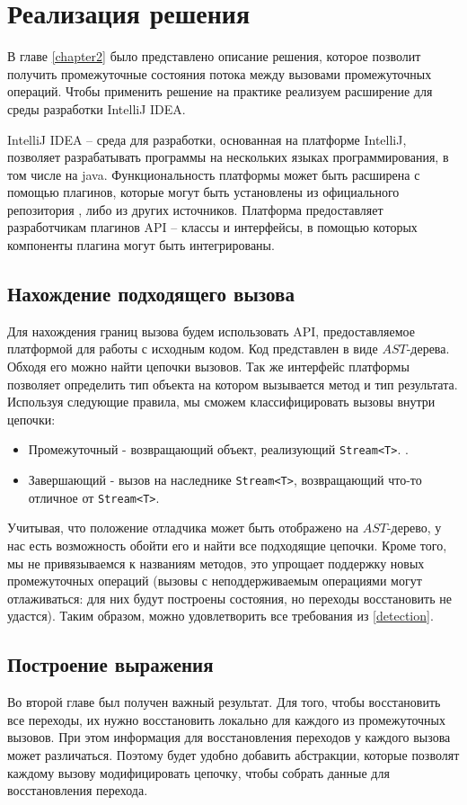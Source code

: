 \section{Реализация решения}\label{chapter3}

В главе \ref{chapter2} было представлено описание решения, которое позволит получить промежуточные состояния потока между вызовами промежуточных операций. Чтобы применить решение на практике реализуем расширение для среды разработки IntelliJ IDEA. 

IntelliJ IDEA -- среда для разработки, основанная на платформе IntelliJ, позволяет разрабатывать программы на нескольких языках программирования, в том числе на java. Функциональность платформы может быть расширена с помощью плагинов, которые могут быть установлены из официального репозитория \cite{jb:plugins}, либо из других источников. Платформа предоставляет разработчикам плагинов API -- классы и интерфейсы, в помощью которых компоненты плагина могут быть интегрированы.
\subsection{Нахождение подходящего вызова}

Для нахождения границ вызова будем использовать API, предоставляемое платформой для работы с исходным кодом. Код представлен в виде $AST$-дерева. Обходя его можно найти цепочки вызовов. Так же интерфейс платформы позволяет определить тип объекта на котором вызывается метод и тип результата. Используя следующие правила, мы сможем классифицировать вызовы внутри цепочки:
\begin{itemize}
	\item Промежуточный - возвращающий объект, реализующий \texttt{Stream<T>}. .
	\item Завершающий - вызов на наследнике \texttt{Stream<T>}, возвращающий что-то отличное от \texttt{Stream<T>}.
\end{itemize}

Учитывая, что положение отладчика может быть отображено на $AST$-дерево, у нас есть возможность обойти его и найти все подходящие цепочки. Кроме того, мы не привязываемся к названиям методов, это упрощает поддержку новых промежуточных операций (вызовы с неподдерживаемым операциями могут отлаживаться: для них будут построены состояния, но переходы восстановить не удастся). Таким образом, можно удовлетворить все требования из \ref{detection}.

\subsection{Построение выражения}
Во второй главе был получен важный результат. Для того, чтобы восстановить все переходы, их нужно восстановить локально для каждого из промежуточных вызовов. При этом информация для восстановления переходов у каждого вызова может различаться. Поэтому будет удобно добавить абстракции, которые позволят каждому вызову модифицировать цепочку, чтобы собрать данные для восстановления перехода. 

